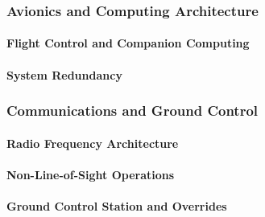 \subsubsection{Avionics and Computing Architecture}
\label{subsubsec:avionics_computing_architecture}

\paragraph{Flight Control and Companion Computing}
\label{par:flight_control_companion_computing}


\paragraph{System Redundancy}
\label{par:system_redundancy}


\subsubsection{Communications and Ground Control}
\label{subsubsec:communications_ground_control}

\paragraph{Radio Frequency Architecture}
\label{par:radio_frequency_architecture}


\paragraph{Non-Line-of-Sight Operations}
\label{par:non_line_of_sight_operations}


\paragraph{Ground Control Station and Overrides}
\label{par:ground_control_station_overrides}


